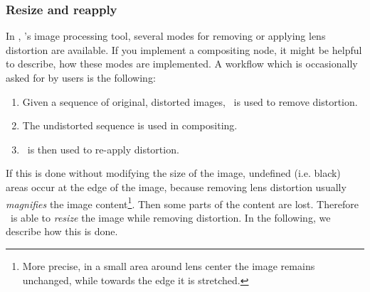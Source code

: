 \documentclass[10pt,a4paper]{article}
\begin{document}
\subsubsection{Resize and reapply}
In \warp, \sdv's image processing tool, several modes for removing or applying lens distortion are available.
If you implement a compositing node, it might be helpful to describe, how these modes are implemented.
A workflow which is occasionally asked for by users is the following:
\begin{enumerate}
\item Given a sequence of original, distorted images, \warp\ is used to remove distortion.
\item The undistorted sequence is used in compositing.
\item \warp\ is then used to re-apply distortion.
\end{enumerate}
If this is done without modifying the size of the image, undefined (i.e. black) areas occur at the edge
of the image, because removing lens distortion usually {\em magnifies} the image
content\footnote{More precise, in a small area around lens center the image remains unchanged,
while towards the edge it is stretched.}. Then some parts of the content are lost.
Therefore \warp\ is able to {\em resize} the image while removing distortion.
In the following, we describe how this is done.
\end{document}
